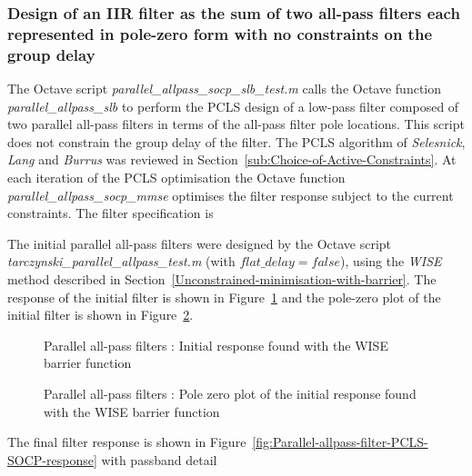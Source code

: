 \documentclass[a4paper,twoside,10pt,english]{report}
\begin{document}
\subsubsection{\label{sec:Design-IIR-filter-sum-all-pass filters-pole-zero-no-constraints-on-group-delay}Design of an IIR filter as the sum of two all-pass filters each represented in pole-zero form with no constraints on the group delay}
The Octave script \emph{parallel\_allpass\_socp\_slb\_test.m} calls the Octave
function \emph{parallel\_allpass\_slb} to perform the PCLS design of a low-pass
filter composed of two parallel all-pass filters in terms of the all-pass filter
pole locations. This script does not constrain the group delay of the filter. 
The PCLS algorithm of \emph{Selesnick}, \emph{Lang} and 
\emph{Burrus} was reviewed in Section~\ref{sub:Choice-of-Active-Constraints}. At
each iteration of the PCLS optimisation the Octave function 
\emph{parallel\_allpass\_socp\_mmse} optimises the filter response subject to 
the current constraints. The filter specification is
\begin{small}

\end{small}
The initial parallel all-pass filters were designed by the Octave script 
\emph{tarczynski\_parallel\_allpass\_test.m} (with $flat\_delay=false$), 
using the \emph{WISE} method described in 
Section~\ref{Unconstrained-minimisation-with-barrier}. The response
of the initial filter is shown in
Figure~\ref{fig:Parallel-allpass-filter-initial-response} and the pole-zero
plot of the initial filter is shown in
Figure~\ref{fig:Parallel-allpass-filter-initial-response-pz}.
\begin{figure}[!htbp]
\begin{center}
\scalebox{0.7}{}
\caption{Parallel all-pass filters : Initial response found with the WISE barrier function}
\label{fig:Parallel-allpass-filter-initial-response}
\end{center}
\end{figure}
\begin{figure}[!htbp]
\begin{center}
\scalebox{0.7}{}
\caption{Parallel all-pass filters : Pole zero plot of the initial response found with the WISE barrier function}
\label{fig:Parallel-allpass-filter-initial-response-pz}
\end{center}
\end{figure}
The final filter response is shown in
Figure~\ref{fig:Parallel-allpass-filter-PCLS-SOCP-response} with passband detail
\end{document}
